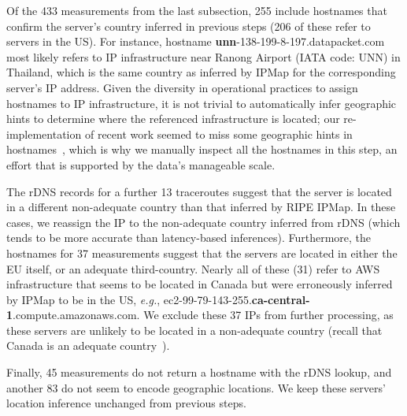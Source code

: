 Of the 433 measurements from the last subsection, 255 include
hostnames that confirm the server's country inferred in previous steps
(206 of these refer to servers in the US).
For instance, hostname \textbf{unn}-138-199-8-197.datapacket.com most likely 
refers to IP infrastructure near 
Ranong Airport (IATA code: UNN) in Thailand, which is the same country as inferred 
by IPMap for the corresponding server's IP address.
Given the diversity in operational practices to assign hostnames to IP infrastructure, 
it is not trivial to automatically
infer geographic hints to determine where the referenced infrastructure
is located; our re-implementation of recent work seemed to miss some geographic hints in hostnames~\cite{geodns}, 
which is why we manually inspect all the hostnames in this step, an 
effort that is supported by the data's manageable scale.

The rDNS records for a further 13 traceroutes suggest that the server is located in 
a different non-adequate country than that inferred by RIPE IPMap. In these cases,
we reassign the IP to the non-adequate country inferred from rDNS 
(which tends to be more accurate than latency-based inferences). 
Furthermore, the hostnames for 37 measurements suggest that the servers are located in either the EU
itself, or an adequate third-country. Nearly all of these (31) refer to AWS infrastructure 
that seems to be located in Canada but were erroneously inferred by IPMap to be in the US,
\textit{e.g.}, ec2-99-79-143-255.\textbf{ca-central-1}.compute.amazonaws.com.
We exclude these 37 IPs from further processing, as these servers are unlikely to be located in a non-adequate 
country (recall that Canada is an adequate country~\cite{Adequacy38:online}).  

Finally, 45 measurements do not return a hostname with the rDNS lookup, 
and another 83 do not seem to encode geographic locations.  We keep these servers' location 
inference unchanged from previous steps. 

